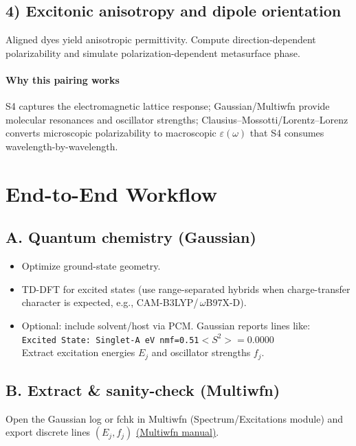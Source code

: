 \documentclass[11pt,a4paper]{article}
\begin{document}
\subsection*{4) Excitonic anisotropy and dipole orientation}
Aligned dyes yield anisotropic permittivity. Compute direction-dependent polarizability and simulate polarization-dependent metasurface phase.

\paragraph{Why this pairing works} S4 captures the electromagnetic lattice response; Gaussian/Multiwfn provide molecular resonances and oscillator strengths; Clausius--Mossotti/Lorentz--Lorenz converts microscopic polarizability to macroscopic $\varepsilon(\omega)$ that S4 consumes wavelength-by-wavelength.

\section{End-to-End Workflow}

\subsection*{A. Quantum chemistry (Gaussian)}
\begin{itemize}
  \item Optimize ground-state geometry.
  \item TD-DFT for excited states (use range-separated hybrids when charge-transfer character is expected, e.g., CAM-B3LYP/\,\mbox{$\omega$}B97X-D).
  \item Optional: include solvent/host via PCM. Gaussian reports lines like: \\
  \texttt{Excited State: Singlet-A eV nm\quad f=0.51\quad $<\!S^2\!>=0.0000$}\\
  Extract excitation energies $E_j$ and oscillator strengths $f_j$.
\end{itemize}

\subsection*{B. Extract \& sanity-check (Multiwfn)}
Open the Gaussian log or fchk in Multiwfn (Spectrum/Excitations module) and export discrete lines $(E_j,f_j)$ \href{https://sobereva.com/multiwfn/misc/Multiwfn_3.8_dev.pdf}{(Multiwfn manual)}.
\end{document}
